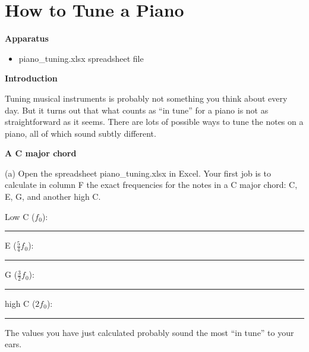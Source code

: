 \section{How to Tune a Piano}


\makelabheader %

\bigskip
\textbf{Apparatus}
\begin{itemize}[nosep]
\item piano\_tuning.xlsx spreadsheet file
\end{itemize}

\medskip
\textbf{Introduction}

Tuning musical instruments is probably not something you think about every day.  But it turns out that what counts as ``in tune'' for a piano is not as straightforward as it seems.  There are lots of possible ways to tune the notes on a piano, all of which sound subtly different.

\medskip
\textbf{A C major chord}

(a) Open the spreadsheet piano\_tuning.xlsx in Excel.  Your first job is to calculate in column F the exact frequencies for the notes in a C major chord: C, E, G, and another high C. 

\vspace{-0.25in}

\hspace{1.10in}\raisebox{-0.25in}{130.8~Hz}

\vspace{-0.15in}
\hfill{}
Low C ($f_0$): \rule{.7in}{0.1pt}\hfill{}
E ($\frac{5}{4}f_0$): \rule{.7in}{0.1pt}\hfill{}
G ($\frac{3}{2}f_0$): \rule{.7in}{0.1pt}\hfill{}
high C ($2f_0$): \rule{.7in}{0.1pt}\hfill{}

The values you have just calculated probably sound the most ``in tune'' to your ears.

